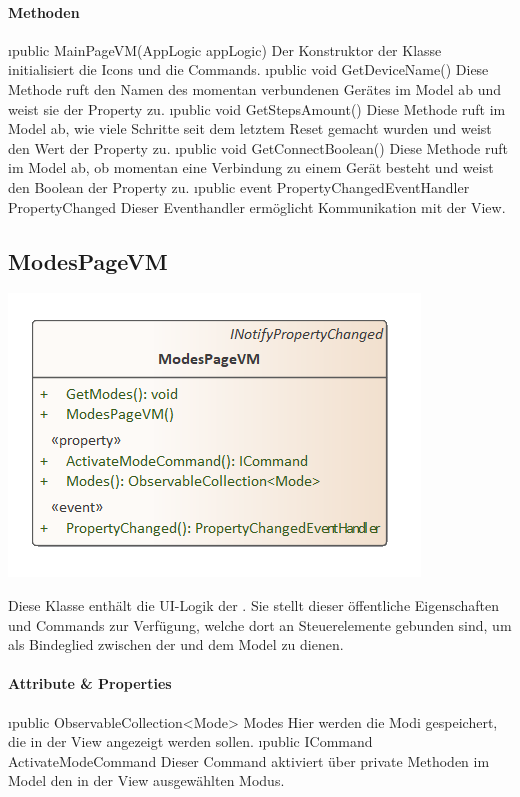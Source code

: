 \documentclass[../entwurf.tex]{subfiles}
\begin{document}
\paragraph{Methoden}
\begin{itemize}
	\i{public MainPageVM(AppLogic appLogic)} Der Konstruktor der Klasse initialisiert die Icons und die Commands.
	\i{public void GetDeviceName()} Diese Methode ruft den Namen des momentan verbundenen Gerätes im Model ab und weist sie der Property  zu.
	\i{public void GetStepsAmount()} Diese Methode ruft im Model ab, wie viele Schritte seit dem letztem Reset gemacht wurden und weist den Wert der Property  zu.
	\i{public void GetConnectBoolean()} Diese Methode ruft im Model ab, ob momentan eine Verbindung zu einem Gerät besteht und weist den Boolean der Property  zu.
	\i{public event PropertyChangedEventHandler PropertyChanged} Dieser Eventhandler ermöglicht Kommunikation mit der View.
\end{itemize}
\subsection{ModesPageVM}
\begin{minipage}{0.5\textwidth}
\includegraphics[scale=0.75]{../graphics/vm_klassen/ModesPageVM.png}
\end{minipage}
\begin{minipage}{0.5\textwidth}
Diese Klasse enthält die UI-Logik der . Sie stellt dieser öffentliche Eigenschaften und Commands zur Verfügung, welche dort an Steuerelemente gebunden sind, um als Bindeglied zwischen der  und dem Model zu dienen.
\end{minipage}
\paragraph{Attribute \& Properties}
\begin{itemize}
	\i{public ObservableCollection<Mode> Modes} Hier werden die Modi gespeichert, die in der View angezeigt werden sollen.
	\i{public ICommand ActivateModeCommand} Dieser Command aktiviert über private Methoden im Model den in der View ausgewählten Modus. 
\end{itemize}
\end{document}
